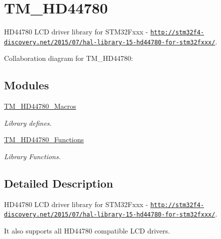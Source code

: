 \hypertarget{group___t_m___h_d44780}{}\section{T\+M\+\_\+\+H\+D44780}
\label{group___t_m___h_d44780}


H\+D44780 L\+CD driver library for S\+T\+M32\+Fxxx -\/ \href{http://stm32f4-discovery.net/2015/07/hal-library-15-hd44780-for-stm32fxxx/}{\tt http\+://stm32f4-\/discovery.\+net/2015/07/hal-\/library-\/15-\/hd44780-\/for-\/stm32fxxx/}.  


Collaboration diagram for T\+M\+\_\+\+H\+D44780\+:
\subsection*{Modules}
\begin{DoxyCompactItemize}
\item 
\hyperlink{group___t_m___h_d44780___macros}{T\+M\+\_\+\+H\+D44780\+\_\+\+Macros}
\begin{DoxyCompactList}\small\item\em Library defines. \end{DoxyCompactList}\item 
\hyperlink{group___t_m___h_d44780___functions}{T\+M\+\_\+\+H\+D44780\+\_\+\+Functions}
\begin{DoxyCompactList}\small\item\em Library Functions. \end{DoxyCompactList}\end{DoxyCompactItemize}


\subsection{Detailed Description}
H\+D44780 L\+CD driver library for S\+T\+M32\+Fxxx -\/ \href{http://stm32f4-discovery.net/2015/07/hal-library-15-hd44780-for-stm32fxxx/}{\tt http\+://stm32f4-\/discovery.\+net/2015/07/hal-\/library-\/15-\/hd44780-\/for-\/stm32fxxx/}. 

It also supports all H\+D44780 compatible L\+CD drivers.

